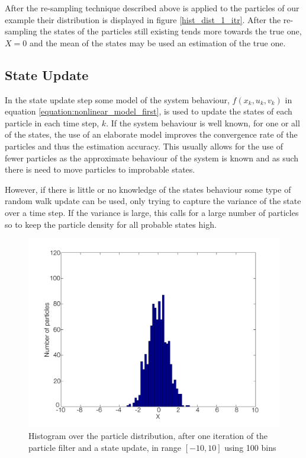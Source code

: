 \documentclass{LTHthesis}
\begin{document}
After the re-sampling technique described above is applied to the particles of our example their distribution is displayed in figure \ref{hist_dist_1_itr}. After the re-sampling the states of the particles still existing tends more towards the true one, $X=0$ and the mean of the states may be used an estimation of the true one.    
% 
\subsection{State Update}
%
In the state update step some model of the system behaviour, $f(x_k,u_k,v_k)$ in equation \ref{equation:nonlinear_model_first}, is used to update the states of each particle in each time step, $k$. If the system behaviour is well known, for one or all of the states, the use  of an elaborate model improves the convergence rate of the particles and thus the estimation accuracy. This usually allows for the use of fewer particles as the approximate behaviour of the system is known and as such there is need to move particles to improbable states. 

However, if there is little or no knowledge of the states behaviour some type of random walk update can be used, only trying to capture the variance of the state over a time step. If the variance is large, this calls for a large number of particles so to keep the particle density for all probable states high. 
%
\begin{figure}[!hbt]

\includegraphics[width=1\textwidth ]{images/PF/hist_dist_1_itr_dyn}
\caption{Histogram over the particle distribution, after one iteration of the particle filter and a state update, in range $[-10,10]$ using 100 bins}\label{hist_dist_1_itr_dyn}
\end{figure}
\end{document}
